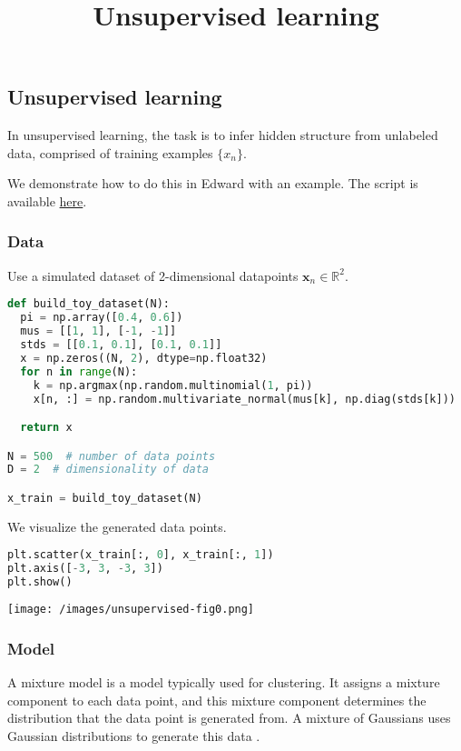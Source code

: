 \title{Unsupervised learning}

\subsection{Unsupervised learning}

In unsupervised learning, the task is to infer hidden structure from
unlabeled data, comprised of training examples $\{x_n\}$.

We demonstrate how to do this in Edward with an example.
The script is available
\href{https://github.com/blei-lab/edward/blob/master/examples/mixture_gaussian_collapsed.py}
{here}.


\subsubsection{Data}

Use a simulated dataset of 2-dimensional datapoints
$\mathbf{x}_n\in\mathbb{R}^2$.
\begin{lstlisting}[language=Python]
def build_toy_dataset(N):
  pi = np.array([0.4, 0.6])
  mus = [[1, 1], [-1, -1]]
  stds = [[0.1, 0.1], [0.1, 0.1]]
  x = np.zeros((N, 2), dtype=np.float32)
  for n in range(N):
    k = np.argmax(np.random.multinomial(1, pi))
    x[n, :] = np.random.multivariate_normal(mus[k], np.diag(stds[k]))

  return x

N = 500  # number of data points
D = 2  # dimensionality of data

x_train = build_toy_dataset(N)
\end{lstlisting}

We visualize the generated data points.
\begin{lstlisting}[language=Python]
plt.scatter(x_train[:, 0], x_train[:, 1])
plt.axis([-3, 3, -3, 3])
plt.show()
\end{lstlisting}
\texttt{[image: /images/unsupervised-fig0.png]}

\subsubsection{Model}

A mixture model is a model typically used for clustering.
It assigns a mixture component to each data point, and this mixture component
determines the distribution that the data point is generated from. A
mixture of Gaussians uses Gaussian distributions to generate this data
\citep{bishop2006pattern}.

